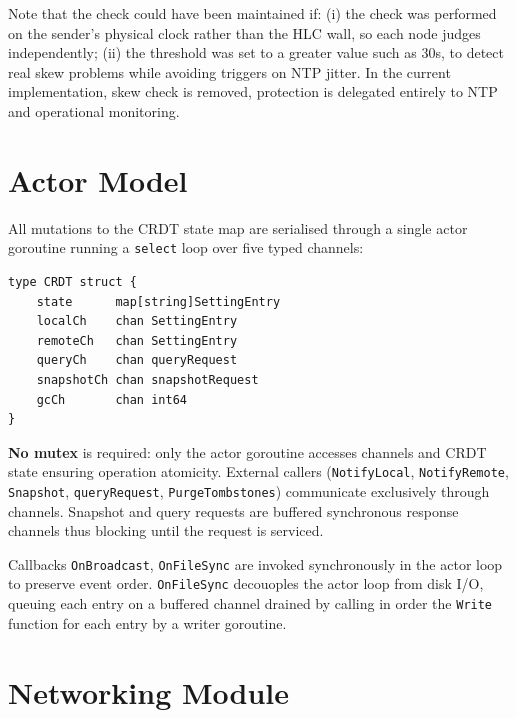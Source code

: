 \documentclass[conference]{IEEEtran}
\begin{document}
Note that the check could have been maintained if: (i) the check was performed on
the sender's physical clock rather than the HLC wall, so each node judges independently;
(ii) the threshold was set to a greater value such as 30s, to detect
real skew problems while avoiding triggers on NTP jitter.
In the current implementation, skew check is removed, protection is
delegated entirely to NTP and operational monitoring.

\section{Actor Model}
\label{sec:actor}

All mutations to the CRDT state map are serialised through a single actor
goroutine running a \texttt{select} loop over five typed channels:

\begin{lstlisting}
type CRDT struct {
    state      map[string]SettingEntry
    localCh    chan SettingEntry
    remoteCh   chan SettingEntry
    queryCh    chan queryRequest
    snapshotCh chan snapshotRequest
    gcCh       chan int64
}
\end{lstlisting}

\textbf{No mutex} is required: only the actor goroutine accesses channels and
CRDT state ensuring operation atomicity. External callers (\texttt{NotifyLocal}, \texttt{NotifyRemote},
\texttt{Snapshot}, \texttt{queryRequest}, \texttt{PurgeTombstones}) communicate exclusively through
channels. Snapshot and query requests are buffered synchronous response channels thus blocking
until the request is serviced.

Callbacks \texttt{OnBroadcast}, \texttt{OnFileSync} are invoked
synchronously in the actor loop {\color{violet}to preserve event order. \texttt{OnFileSync}
  decouoples the actor loop from disk I/O, queuing each entry on a buffered channel drained by
calling in order the \texttt{Write} function for each entry by a writer goroutine.}

\section{Networking Module}
\label{sec:network}
\end{document}
